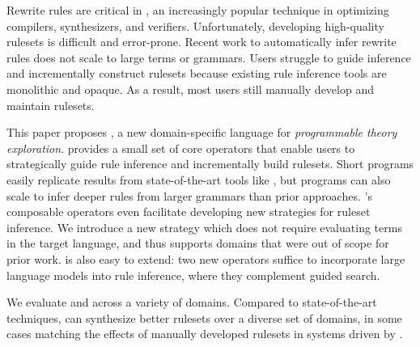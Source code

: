 Rewrite rules are critical in \eqsat,
  an increasingly popular technique in
  optimizing compilers, synthesizers, and verifiers.
Unfortunately, developing high-quality rulesets
  is difficult and error-prone.
Recent work to automatically infer rewrite rules
  does not scale to large terms or grammars.
Users struggle to guide inference and
  incrementally construct rulesets because
  existing rule inference tools
  are monolithic and opaque.
As a result,
  most \eqsat users still
  manually develop and maintain rulesets.

This paper proposes \enumo,
  a new domain-specific language for
  \textit{programmable theory exploration}.
\enumo provides a small set of core operators that
  enable users to strategically guide rule inference
  and incrementally build rulesets.
Short \enumo programs easily replicate
  results from state-of-the-art tools like \Ruler, but
  \enumo programs can also scale to infer
  deeper rules from larger grammars
  than prior approaches.
\enumo's composable operators even facilitate
  developing new strategies for ruleset inference.
We introduce a new \textit{\ff} strategy
  which does not require evaluating terms in the target language,
  and thus supports domains that
  were out of scope for prior work.
\enumo is also easy to extend:
  two new operators suffice to incorporate
  large language models into rule inference,
  where they complement guided search.

We evaluate \enumo and \ff across a variety of domains.
Compared to state-of-the-art techniques,
  \enumo can synthesize better rulesets
  over a diverse set of domains,
  in some cases matching the effects of
  manually developed rulesets in
  systems driven by \eqsat.

